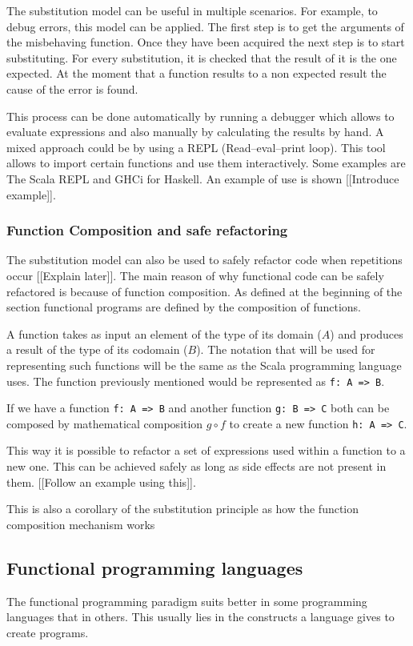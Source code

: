 \documentclass[../main.tex]{subfiles}
\begin{document}
The substitution model can be useful in multiple scenarios. For example, to debug errors, this model can be applied. The first step is to get the arguments of the misbehaving function. Once they have been acquired the next step is to start substituting. For every substitution, it is checked that the result of it is the one expected. At the moment that a function results to a non expected result the cause of the error is found.

This process can be done automatically by running a debugger which allows to evaluate expressions and also manually by calculating the results by hand. A mixed approach could be by using a REPL (Read–eval–print loop). This tool allows to import certain functions and use them interactively. Some examples are The Scala REPL and GHCi for Haskell. An example of use is shown [[Introduce example]].

\subsubsection{Function Composition and safe refactoring}
The substitution model can also be used to safely refactor code when repetitions occur [[Explain later]].  
The main reason of why functional code can be safely refactored is because of function composition. As defined at the beginning of the section functional programs are defined by the composition of functions.

A function takes as input an element of the type of its domain ($A$) and produces a result of the type of its codomain ($B$). The notation that will be used for representing such functions will be the same as the Scala programming language uses. The function previously mentioned would be represented as \texttt{f: A => B}.

If we have a function \texttt{f: A => B} and another function \texttt{g: B => C} both can be composed by mathematical composition $g \circ f$ to create a new function \texttt{h: A => C}.

This way it is possible to refactor a set of expressions used within a function to a new one. This can be achieved safely as long as side effects are not present in them. [[Follow an example using this]].

This is also a corollary of the substitution principle as how the function composition mechanism works

\subsection{Functional programming languages}
The functional programming paradigm suits better in some programming languages that in others. This usually lies in the constructs a language gives to create programs. 
\end{document}
